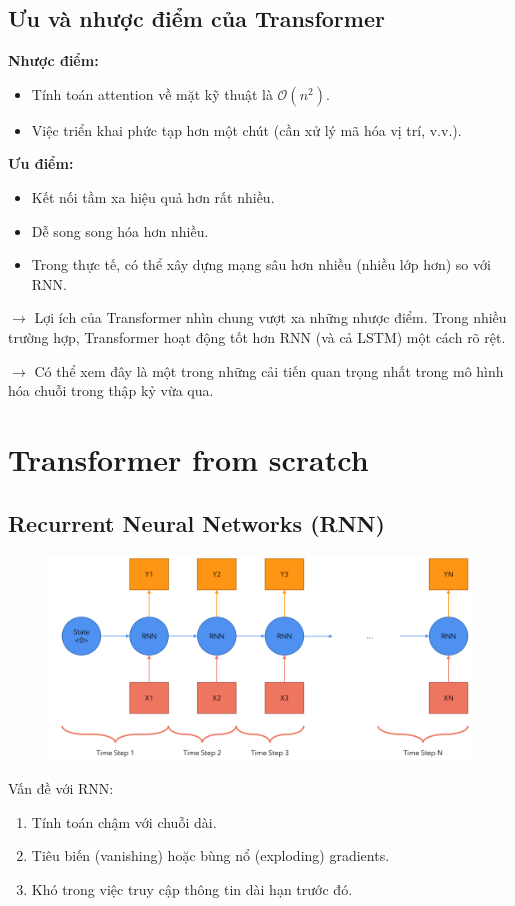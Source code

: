 \documentclass{book}
\begin{document}
\section*{Ưu và nhược điểm của Transformer}

\textbf{Nhược điểm:}
\begin{itemize}
    \item Tính toán attention về mặt kỹ thuật là \( \mathcal{O}(n^2) \).
    \item Việc triển khai phức tạp hơn một chút (cần xử lý mã hóa vị trí, v.v.).
\end{itemize}

\textbf{Ưu điểm:}
\begin{itemize}
    \item Kết nối tầm xa hiệu quả hơn rất nhiều.
    \item Dễ song song hóa hơn nhiều.
    \item Trong thực tế, có thể xây dựng mạng sâu hơn nhiều (nhiều lớp hơn) so với RNN.
\end{itemize}

$\rightarrow$ Lợi ích của Transformer nhìn chung vượt xa những nhược điểm. Trong nhiều trường hợp, Transformer hoạt động tốt hơn RNN (và cả LSTM) một cách rõ rệt.

$\rightarrow$ Có thể xem đây là một trong những cải tiến quan trọng nhất trong mô hình hóa chuỗi trong thập kỷ vừa qua.

\chapter{Transformer from scratch}
    \section{Recurrent Neural Networks (RNN)}
    \begin{figure}[H]
        \centering
        \includegraphics[width=0.9\linewidth]{images/12d_1.png}

    \end{figure}
    Vấn đề với RNN:
    \begin{enumerate}
        \item Tính toán chậm với chuỗi dài.
        \item Tiêu biến (vanishing) hoặc bùng nổ (exploding) gradients.
        \item Khó trong việc truy cập thông tin dài hạn trước đó.
    \end{enumerate}
\end{document}

